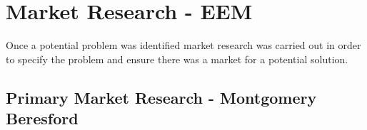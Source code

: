 \documentclass[11pt]{article}		%
\begin{document}
	
	
	

    \section{Market Research - EEM}
        
        Once a potential problem was identified market research was carried out in order to specify the problem and ensure there was a market for a potential solution. 
        
        \subsection[Primary Market Research]{Primary Market Research - Montgomery Beresford}
        
\end{document}
